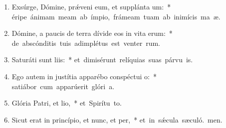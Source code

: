 \begin{flushleft}
\begin{enumerate}[leftmargin=*]
\item Exsúrge, Dómine, prǽveni eum, et supplánta um:~* \mbox{éripe ánimam meam ab ímpio, frámeam tuam ab inimícis ma æ.}

\item Dómine, a paucis de terra dívide eos in vita erum:~* \mbox{de abscónditis tuis adimplétus est venter rum.}

\item Saturáti sunt liis:~* \mbox{et dimisérunt relíquias suas párvu is.}

\item Ego autem in justítia apparébo conspéctui o:~* \mbox{satiábor cum apparúerit glóri a.}

\item Glória Patri, et lio,~* \mbox{et Spirítu to.}

\item Sicut erat in princípio, et nunc, et per,~* \mbox{et in sǽcula sæculó. men.}

\end{enumerate}
\end{flushleft}
